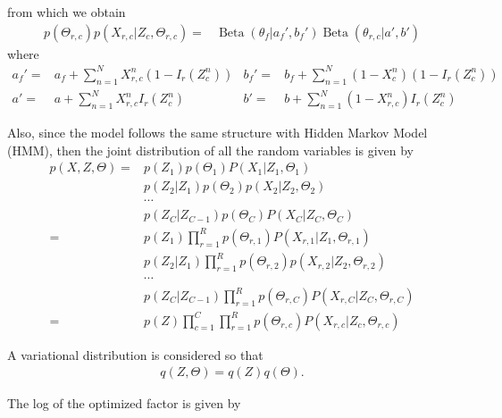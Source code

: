 \documentclass[11pt]{extarticle}
\newcommand{\0}{\mathbf{0}}
\renewcommand{\(}{\left(}
\renewcommand{\)}{\right)}
\DeclareMathOperator{\Beta}{Beta}
\theoremstyle{definition}
\begin{document}
from which we obtain
\begin{align*}
	p(\Theta_{r,c})p(X_{r,c} \vert Z_{c}, \Theta_{r,c}) =& \Beta(\theta_{f} \vert a_{f}', b_{f}') \Beta(\theta_{r,c}\vert a', b')
\end{align*}
where 
\begin{align*}
	a_{f}' 	=& a_{f} + \sum_{n=1}^{N} X^{n}_{r,c}(1-I_{r}(Z^{n}_{c})) &
	b_{f}' 	=& b_{f} + \sum_{n=1}^{N} (1-X^{n}_{c})(1-I_{r}(Z^{n}_{c})) \\
	a' 		=& a + \sum_{n=1}^{N} X^{n}_{r,c}I_{r}(Z^{n}_{c}) &
	b' 		=& b + \sum_{n=1}^{N} (1 - X^{n}_{r,c})I_{r}(Z^{n}_{c})
\end{align*}
\par Also, since the model follows the same structure with Hidden Markov Model (HMM), then the joint distribution of all the random variables is given by
\begin{align*}
	p(X, Z, \Theta) =& p(Z_{1}) p(\Theta_{1}) P(X_{1} \vert Z_{1}, \Theta_{1}) \\
	 & p(Z_{2} \vert Z_{1}) p(\Theta_{2}) p(X_{2} \vert Z_{2}, \Theta_{2}) \\
	 & \cdots \\
	 & p(Z_{C} \vert Z_{C-1}) p(\Theta_{C}) P(X_{C} \vert Z_{C}, \Theta_{C}) \\
	=& p(Z_{1}) \prod_{r=1}^{R} p(\Theta_{r,1}) P(X_{r,1} \vert Z_{1}, \Theta_{r,1}) \\
	 & p(Z_{2} \vert Z_{1}) \prod_{r=1}^{R} p(\Theta_{r,2}) p(X_{r,2} \vert Z_{2}, \Theta_{r,2}) \\
	 & \cdots \\
	 & p(Z_{C} \vert Z_{C-1}) \prod_{r=1}^{R} p(\Theta_{r,C}) P(X_{r,C} \vert Z_{C}, \Theta_{r,C}) \\
	=& p(Z) \prod_{c=1}^{C} \prod_{r=1}^{R} p(\Theta_{r,c}) P(X_{r,c} \vert Z_{c}, \Theta_{r,c})
\end{align*}
\par A variational distribution is considered so that
\begin{align*}
	q(Z, \Theta) = q(Z) q(\Theta).
\end{align*}
\par The log of the optimized factor is given by
\end{document}
